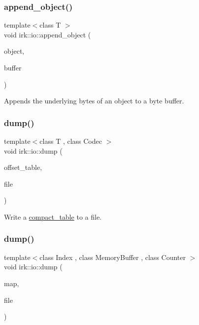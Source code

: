 \subsubsection{\texorpdfstring{append\+\_\+object()}{append\_object()}}
{\footnotesize\ttfamily template$<$class T $>$ \\
void irk\+::io\+::append\+\_\+object (\begin{DoxyParamCaption}\item[{const T \&}]{object,  }\item[{std\+::vector$<$ char $>$ \&}]{buffer }\end{DoxyParamCaption})}



Appends the underlying bytes of an object to a byte buffer. 

\mbox{\label{namespaceirk_1_1io_a6b755deadffffcc321eccc3c1a537555}} 
\subsubsection{\texorpdfstring{dump()}{dump()}\hspace{0.1cm}{\footnotesize\ttfamily [1/2]}}
{\footnotesize\ttfamily template$<$class T , class Codec $>$ \\
void irk\+::io\+::dump (\begin{DoxyParamCaption}\item[{const \mbox{\hyperlink{classirk_1_1compact__table}{compact\+\_\+table}}$<$ T, Codec $>$ \&}]{offset\+\_\+table,  }\item[{const fs\+::path \&}]{file }\end{DoxyParamCaption})}



Write a {\ttfamily \mbox{\hyperlink{classirk_1_1compact__table}{compact\+\_\+table}}} to a file. 

\mbox{\label{namespaceirk_1_1io_a4b74cc5a440f69992ce2302aebfc0b4d}} 
\subsubsection{\texorpdfstring{dump()}{dump()}\hspace{0.1cm}{\footnotesize\ttfamily [2/2]}}
{\footnotesize\ttfamily template$<$class Index , class Memory\+Buffer , class Counter $>$ \\
void irk\+::io\+::dump (\begin{DoxyParamCaption}\item[{const \mbox{\hyperlink{classirk_1_1prefix__map}{prefix\+\_\+map}}$<$ Index, Memory\+Buffer, Counter $>$ \&}]{map,  }\item[{fs\+::path}]{file }\end{DoxyParamCaption})}

